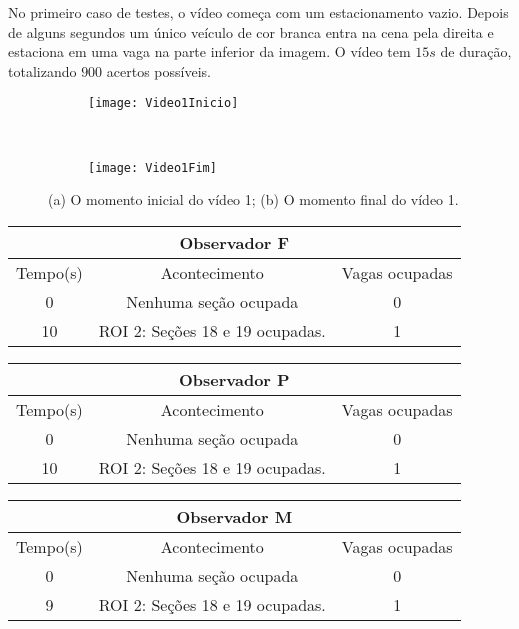 No primeiro caso de testes, o vídeo começa com um estacionamento vazio. Depois de alguns segundos um único veículo de cor branca entra na cena pela direita e estaciona em uma vaga na parte inferior da imagem. O vídeo tem $15s$ de duração, totalizando $900$ acertos possíveis.

\begin{figure}[!h]
\centering
\begin{subfigure}{.5\textwidth}
\centering
\texttt{[image: Video1Inicio]}
\caption{}
\end{subfigure}\
\begin{subfigure}{.5\textwidth}
\centering
\texttt{[image: Video1Fim]}
\caption{}
\end{subfigure}
\centering
\caption{(a) O momento inicial do vídeo 1; (b) O momento final do vídeo 1.}%
\label{}%
\end{figure}


\begin{center}
\begin{tabular}{|c||c||c|}
\hline
\multicolumn{3}{|c|}{Observador F}  \\ \hline \hline
Tempo(s) & Acontecimento & Vagas ocupadas\\ \hline
0 & Nenhuma seção ocupada & 0 \\ \hline
10 & ROI 2: Seções 18 e 19 ocupadas. & 1 \\
\hline
\end{tabular}
\end{center}

\begin{center}
\begin{tabular}{|c||c||c|}
\hline
\multicolumn{3}{|c|}{Observador P}  \\ \hline \hline
Tempo(s) & Acontecimento & Vagas ocupadas\\ \hline
0 & Nenhuma seção ocupada & 0 \\ \hline
10 & ROI 2: Seções 18 e 19 ocupadas. & 1 \\
\hline
\end{tabular}
\end{center}

\begin{center}
\begin{tabular}{|c||c||c|}
\hline
\multicolumn{3}{|c|}{Observador M}  \\ \hline \hline
Tempo(s) & Acontecimento & Vagas ocupadas\\ \hline
0 & Nenhuma seção ocupada & 0 \\ \hline
9 & ROI 2: Seções 18 e 19 ocupadas. & 1 \\
\hline
\end{tabular}
\end{center}

